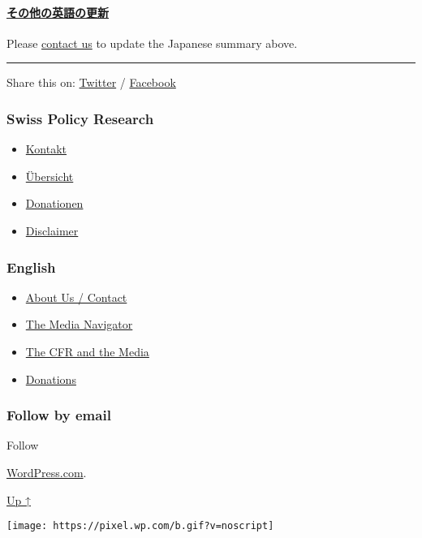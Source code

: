 \hypertarget{ux305dux306eux4ed6ux306eux82f1ux8a9eux306eux66f4ux65b0}{%
\paragraph{\texorpdfstring{\href{https://swprs.org/a-swiss-doctor-on-covid-19/}{その他の英語の更新}}{その他の英語の更新}}\label{ux305dux306eux4ed6ux306eux82f1ux8a9eux306eux66f4ux65b0}}

Please \href{https://swprs.org/contact/}{contact us} to update the
Japanese summary above.

\begin{center}\rule{0.5\linewidth}{\linethickness}\end{center}

Share this on:
\href{https://twitter.com/intent/tweet?url=https://swprs.org/covid19-facts-japanese/}{Twitter}
/
\href{https://www.facebook.com/share.php?u=https://swprs.org/covid19-facts-japanese/}{Facebook}

\hypertarget{swiss-policy-research}{%
\subsubsection{Swiss Policy Research}\label{swiss-policy-research}}

\begin{itemize}
\tightlist
\item
  \href{https://swprs.org/kontakt/}{Kontakt}
\item
  \href{https://swprs.org/uebersicht/}{Übersicht}
\item
  \href{https://swprs.org/donationen/}{Donationen}
\item
  \href{https://swprs.org/disclaimer/}{Disclaimer}
\end{itemize}

\hypertarget{english}{%
\subsubsection{English}\label{english}}

\begin{itemize}
\tightlist
\item
  \href{https://swprs.org/contact/}{About Us / Contact}
\item
  \href{https://swprs.org/media-navigator/}{The Media Navigator}
\item
  \href{https://swprs.org/the-american-empire-and-its-media/}{The CFR
  and the Media}
\item
  \href{https://swprs.org/donations/}{Donations}
\end{itemize}

\hypertarget{follow-by-email}{%
\subsubsection{Follow by email}\label{follow-by-email}}

Follow

\href{https://wordpress.com/?ref=footer_custom_com}{WordPress.com}.

\protect\hyperlink{}{Up ↑}

\texttt{[image: https://pixel.wp.com/b.gif?v=noscript]}

